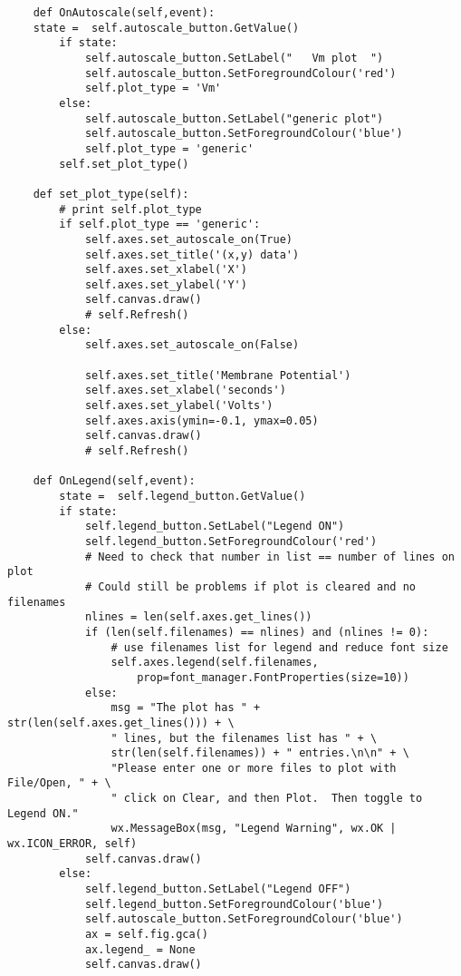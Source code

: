 \documentclass[12pt]{article}
\begin{document}
\begin{verbatim}
    def OnAutoscale(self,event):
	state =	 self.autoscale_button.GetValue()
        if state:
            self.autoscale_button.SetLabel("   Vm plot  ")
            self.autoscale_button.SetForegroundColour('red')
            self.plot_type = 'Vm'
        else:
            self.autoscale_button.SetLabel("generic plot")
            self.autoscale_button.SetForegroundColour('blue')
            self.plot_type = 'generic'
        self.set_plot_type()

    def set_plot_type(self):
        # print self.plot_type
        if self.plot_type == 'generic':
            self.axes.set_autoscale_on(True)
            self.axes.set_title('(x,y) data')
            self.axes.set_xlabel('X')
            self.axes.set_ylabel('Y')
            self.canvas.draw()
            # self.Refresh()
        else:
            self.axes.set_autoscale_on(False)

            self.axes.set_title('Membrane Potential')
            self.axes.set_xlabel('seconds')
            self.axes.set_ylabel('Volts')
            self.axes.axis(ymin=-0.1, ymax=0.05)
            self.canvas.draw()
            # self.Refresh()

    def OnLegend(self,event):
        state =  self.legend_button.GetValue()
        if state:
            self.legend_button.SetLabel("Legend ON")
            self.legend_button.SetForegroundColour('red')
            # Need to check that number in list == number of lines on plot
            # Could still be problems if plot is cleared and no filenames
            nlines = len(self.axes.get_lines())
            if (len(self.filenames) == nlines) and (nlines != 0):
                # use filenames list for legend and reduce font size
                self.axes.legend(self.filenames, 
                    prop=font_manager.FontProperties(size=10))
            else:
                msg = "The plot has " + str(len(self.axes.get_lines())) + \
                " lines, but the filenames list has " + \
                str(len(self.filenames)) + " entries.\n\n" + \
                "Please enter one or more files to plot with File/Open, " + \
                " click on Clear, and then Plot.  Then toggle to Legend ON."
                wx.MessageBox(msg, "Legend Warning", wx.OK | wx.ICON_ERROR, self)
            self.canvas.draw()
        else:
            self.legend_button.SetLabel("Legend OFF")
            self.legend_button.SetForegroundColour('blue')
            self.autoscale_button.SetForegroundColour('blue')
            ax = self.fig.gca()
            ax.legend_ = None
            self.canvas.draw()


\end{verbatim}
\end{document}
